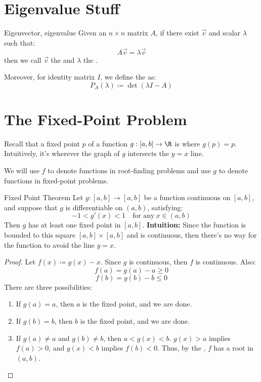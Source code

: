 \section{Eigenvalue Stuff}

\begin{dfnbox}{Eigenvector, eigenvalue}{}
    Given an $n \times n$ matrix $A$, if there exist $\vec{v}$ and scalar $\lambda$ such that:
    \[ A\vec{v} = \lambda \vec{v} \]
    then we call $\vec{v}$ the  and $\lambda$ the .
\end{dfnbox}

Moreover, for identity matrix $I$, we define the  as:
\[ P_A(\lambda) \coloneq \det(\lambda I - A) \]

\section{The Fixed-Point Problem}
Recall that a fixed point $p$ of a function $g : [a,b] \to \R$ is where $g(p) = p$. Intuitively, it's wherever the graph of $g$ intersects the $y=x$ line.

\begin{notebox}
    We will use $f$ to denote functions in root-finding problems and use $g$ to denote functions in fixed-point problems.
\end{notebox}

\begin{thmbox}{Fixed Point Theorem}{}
    Let $g : [a,b] \to [a,b]$ be a function continuous on $[a,b]$, and suppose that $g$ is differentiable on $(a,b)$, satisfying:
    \[ -1 < g\prime(x) < 1 \quad \text{for any}\ x \in (a,b) \]
    Then $g$ has at least one fixed point in $[a,b]$.
    \tcblower
    \textbf{Intuition:} Since the function is bounded to this square $[a,b] \times [a,b]$ and is continuous, then there's no way for the function to avoid the line $y=x$.
    \begin{proof}
        Let $f(x) \coloneq g(x) - x$. Since $g$ is continuous, then $f$ is continuous. Also:
        \[ f(a) = g(a) - a \geq 0 \]
        \[ f(b) = g(b) - b \leq 0 \]
        There are three possibilities:
        \begin{enumerate}
            \item If $g(a) = a$, then $a$ is the fixed point, and we are done.
            \item If $g(b) = b$, then $b$ is the fixed point, and we are done.
            \item If $g(a) \neq a$ and $g(b) \neq b$, then $a < g(x) < b$. $g(x) > a$ implies $f(a) > 0$, and $g(x) < b$ implies $f(b) < 0$. Thus, by the , $f$ has a root in $(a,b)$.
        \end{enumerate}

    \end{proof}
\end{thmbox}


